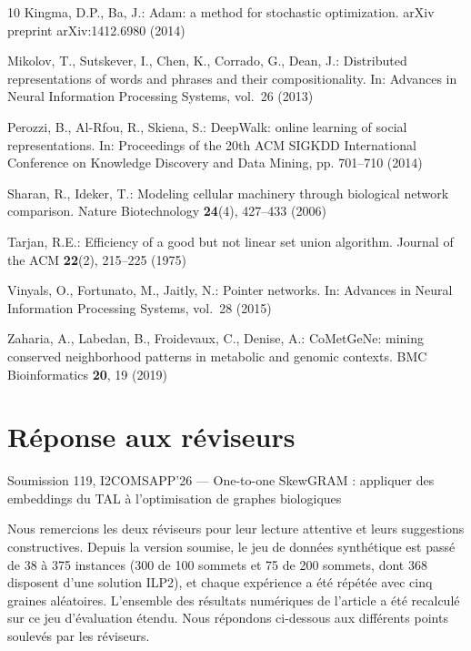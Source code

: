 \documentclass{llncs}
\begin{document}
\begin{thebibliography}{10}
Kingma, D.P., Ba, J.: Adam: a method for stochastic optimization. arXiv preprint arXiv:1412.6980 (2014)

Mikolov, T., Sutskever, I., Chen, K., Corrado, G., Dean, J.: Distributed representations of words and phrases and their compositionality. In: Advances in Neural Information Processing Systems, vol.~26 (2013)

Perozzi, B., Al-Rfou, R., Skiena, S.: DeepWalk: online learning of social representations. In: Proceedings of the 20th ACM SIGKDD International Conference on Knowledge Discovery and Data Mining, pp. 701--710 (2014)

Sharan, R., Ideker, T.: Modeling cellular machinery through biological network comparison. Nature Biotechnology \textbf{24}(4), 427--433 (2006)

Tarjan, R.E.: Efficiency of a good but not linear set union algorithm. Journal of the ACM \textbf{22}(2), 215--225 (1975)

Vinyals, O., Fortunato, M., Jaitly, N.: Pointer networks. In: Advances in Neural Information Processing Systems, vol.~28 (2015)

Zaharia, A., Labedan, B., Froidevaux, C., Denise, A.: CoMetGeNe: mining conserved neighborhood patterns in metabolic and genomic contexts. BMC Bioinformatics \textbf{20}, 19 (2019)

\end{thebibliography}

\clearpage
\section*{Réponse aux réviseurs}
\noindent Soumission 119, I2COMSAPP'26 --- \og One-to-one SkewGRAM : appliquer des embeddings du TAL à l'optimisation de graphes biologiques \fg
\medskip

Nous remercions les deux réviseurs pour leur lecture attentive et leurs suggestions constructives. Depuis la version soumise, le jeu de données synthétique est passé de 38 à 375 instances (300 de 100 sommets et 75 de 200 sommets, dont 368 disposent d'une solution ILP2), et chaque expérience a été répétée avec cinq graines aléatoires. L'ensemble des résultats numériques de l'article a été recalculé sur ce jeu d'évaluation étendu. Nous répondons ci-dessous aux différents points soulevés par les réviseurs.
\end{document}
